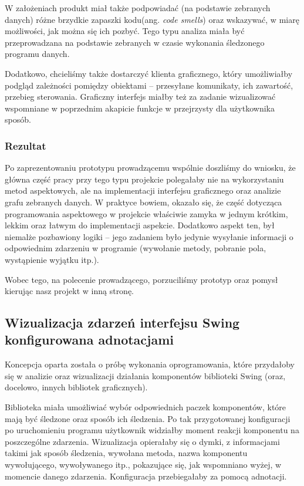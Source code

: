 \documentclass[12pt,a4paper,titlepage]{article}
\begin{document}
  W założeniach produkt miał także podpowiadać (na podstawie zebranych danych) różne brzydkie zapaszki kodu(ang. \textit{code smells}) oraz wskazywać, w miarę możliwości, jak można się ich pozbyć. Tego typu analiza miała być przeprowadzana na podstawie zebranych w czasie wykonania śledzonego programu danych.
  
  Dodatkowo, chcieliśmy także dostarczyć klienta graficznego, który umożliwiałby podgląd zależności pomiędzy obiektami -- przesyłane komunikaty, ich zawartość, przebieg sterowania. Graficzny interfejs miałby też za zadanie wizualizować wspomniane w poprzednim akapicie funkcje w przejrzysty dla użytkownika sposób.
  \subsubsection*{Rezultat}
   Po zaprezentowaniu prototypu prowadzącemu wspólnie doszliśmy do wniosku, że główna część pracy przy tego typu projekcie polegałaby nie na wykorzystaniu metod aspektowych, ale na implementacji interfejsu graficznego oraz analizie grafu zebranych danych. W praktyce bowiem, okazało się, że część dotycząca programowania aspektowego w projekcie właściwie zamyka w jednym krótkim, lekkim oraz łatwym do implementacji aspekcie. Dodatkowo aspekt ten, był niemalże pozbawiony logiki -- jego zadaniem było jedynie wysyłanie informacji o odpowiednim zdarzeniu w programie (wywołanie metody, pobranie pola, wystąpienie wyjątku itp.). 
   
   Wobec tego, na polecenie prowadzącego, porzuciliśmy prototyp oraz pomysł kierując nasz projekt w inną stronę. 
   
 \subsection{Wizualizacja zdarzeń interfejsu Swing konfigurowana adnotacjami}
 Koncepcja oparta została o próbę wykonania oprogramowania, które przydałoby się w analizie oraz wizualizacji działania komponentów biblioteki Swing (oraz, docelowo, innych bibliotek graficznych).
 
 Biblioteka miała umożliwiać wybór odpowiednich paczek komponentów, które mają być śledzone oraz sposób ich śledzenia. Po tak przygotowanej konfiguracji po uruchomieniu programu użytkownik widziałby moment reakcji komponentu na poszczególne zdarzenia. Wizualizacja opierałaby się o dymki, z informacjami takimi jak sposób śledzenia, wywołana metoda, nazwa komponentu wywołującego, wywoływanego itp., pokazujące się, jak wspomniano wyżej, w momencie danego zdarzenia. Konfiguracja przebiegałaby za pomocą adnotacji.
 
\end{document}
